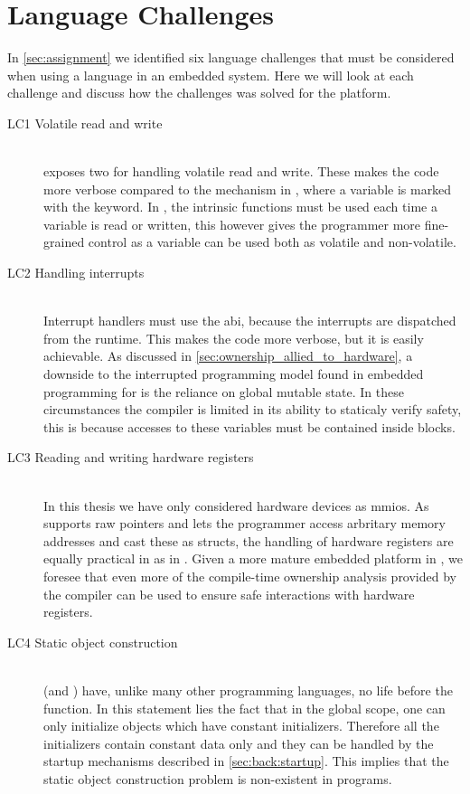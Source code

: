 \section{Language Challenges}

In \autoref{sec:assignment} we identified six language challenges that must be considered when using a language in an embedded system.
Here we will look at each challenge and discuss how the challenges was solved for the {\rg} platform.

\begin{description}
\item [LC1 Volatile read and write] \hfill \\
  {\rust} exposes two  for handling volatile read and write.
  These makes the code more verbose compared to the mechanism in {\C}, where a variable is marked with the  keyword.
  In {\rust}, the intrinsic functions must be used each time a variable is read or written, this however gives the programmer more fine-grained control as a variable can be used both as volatile and non-volatile.

\item [LC2 Handling interrupts] \hfill \\
  Interrupt handlers must use the {\C} \gls{abi}, because the interrupts are dispatched from the {\C} runtime.
  This makes the code more verbose, but it is easily achievable.
  As discussed in \autoref{sec:ownership_allied_to_hardware}, a downside to the interrupted programming model found in embedded programming for {\rust} is the reliance on global mutable state.
  In these circumstances the compiler is limited in its ability to staticaly verify safety, this is because accesses to these variables must be contained inside {\unsafe} blocks.

\item [LC3 Reading and writing hardware registers] \hfill \\
  In this thesis we have only considered hardware devices as \glspl{mmio}.
  As {\rust} supports raw pointers and lets the programmer access arbritary memory addresses and cast these as structs, the handling of hardware registers are equally practical in {\rust} as in {\C}.
  Given a more mature embedded platform in {\rust}, we foresee that even more of the compile-time ownership analysis provided by the {\rust} compiler can be used to ensure safe interactions with hardware registers.

\item [LC4 Static object construction] \hfill \\
  {\rust} (and {\C}) have, unlike many other programming languages, no life before the {\main} function.
  In this statement lies the fact that in the global scope, one can only initialize objects which have constant initializers.
  Therefore all the initializers contain constant data only and they can be handled by the startup mechanisms described in \autoref{sec:back:startup}.
  This implies that the static object construction problem is non-existent in {\rust} programs.


\end{description}
